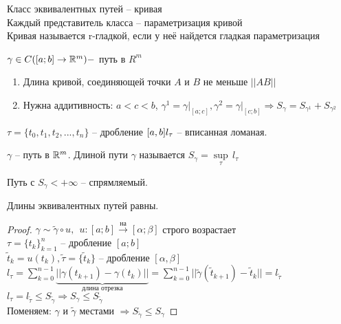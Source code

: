 \begin{Def} 
	Класс эквивалентных путей -- кривая\\
	Каждый представитель класса -- параметризация кривой\\
	Кривая называется r-гладкой, если у неё найдется гладкая параметризация
\end{Def} 

\begin{Def} 
	$\gamma \in C([a;b] \to \mathbb{R}^m) -$ путь в $R^m$
	\begin{enumerate}
		\item Длина кривой, соединяющей точки $A$ и $B$ не меньше $||AB||$
		\item Нужна аддитивность: $a < c < b$, $\gamma^1 = \gamma \big|_{[a;c]},
		\gamma^2=\gamma \big|_{[c;b]} \Rightarrow S_{\gamma} = S_{\gamma^1} + S_{\gamma^2}$
	\end{enumerate}
\end{Def} 

\begin{Example}
	$\tau = \{t_0, t_1, t_2, ..., t_n \}$ -- дробление $[a, b]\\
	l_{\tau}$ -- вписанная ломаная. 
\end{Example}

\begin{figure*}[h]
	\centering
	\def\svgwidth{0.4\columnwidth}
	
\end{figure*}

\begin{Def} 
	$\gamma$ -- путь в $\mathbb{R}^m$. Длиной пути $\gamma$ называется $S_{\gamma} = \underset{\tau}{\sup} \, l_{\tau}$ 
\end{Def} 

\begin{Def} 
	Путь с $S_{\gamma} < + \infty$ -- спрямляемый. 
\end{Def} 

\begin{Lm}
	Длины эквивалентных путей равны.	
\end{Lm}
\begin{proof}
	$\gamma \sim \widetilde{\gamma} \circ u, \ \ u: [a;b] \overset{\text{на}}{\to}{[\alpha; \beta]}$ строго возрастает\\
	$\tau = \{t_k\}^n_{k=1}$ -- дробление $[a;b]$\\
	$\widetilde{t}_k = u(t_k), \widetilde{\tau} = \{\widetilde{t}_k\}$ -- дробление $[\alpha, \beta]$\\
	$\displaystyle l_{\tau} = \sum_{k=0}^{n-1} \underbrace{||\gamma(t_{k+1}) - \gamma(t_k)||}_{\text{{ длина отрезка }}} = 
	\sum_{k=0}^{n-1} || \widetilde{\gamma} (\widetilde{t}_{k+1}) - \widetilde{t}_k|| = l_{\widetilde{\tau}}$\\
	$l_{\tau} = l_{\widetilde{\tau}} \leqslant S_{\widetilde{\gamma}} \Rightarrow S_{\gamma} \leqslant S_{\widetilde{\gamma}}$\\
	Поменяем: $\gamma$ и $\widetilde{\gamma}$ местами $\Rightarrow S_{\widetilde{\gamma}} \leqslant S_{\gamma}$
\end{proof}

